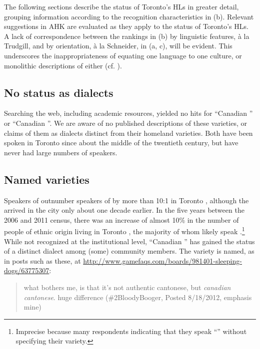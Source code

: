 \documentclass[output=paper]{LSP/langsci}
\begin{document}
The following sections describe the status of Toronto’s HLs in greater detail, grouping information according to the recognition characteristics in  (b). Relevant suggestions in AHK are evaluated as they apply to the status of Toronto’s HLs. A lack of correspondence between the rankings in  (b) by linguistic features, à la Trudgill, and by orientation, à la Schneider, in  (a, c), will be evident. This underscores the inappropriateness of equating one language to one culture, or monolithic descriptions of either (cf. \citealt{foley_personhood_2005}). 

\subsection{No status as dialects}

Searching the web, including academic resources, yielded no hits for “Canadian ” or “Canadian ”. We are aware of no published descriptions of these varieties, or claims of them as dialects distinct from their homeland varieties. Both have been spoken in Toronto since about the middle of the twentieth century, but have never had large numbers of speakers.

\subsection{Named varieties}

Speakers of  outnumber speakers of  by more than 10:1 in Toronto \citep{statistics_canada_census_2011}, although the  arrived in the city only about one decade earlier. In the five years between the 2006 and 2011 census, there was an increase of almost 10\% in the number of people of  ethnic origin living in Toronto \citep{statistics_canada_2011_2011}, the majority of whom likely speak .\footnote{ Imprecise because many respondents indicating that they speak “” without specifying their variety. } While not recognized at the institutional level, “Canadian ” has gained the status of a distinct dialect among (some) community members. The variety is named, as in posts such as these, at \url{http://www.gamefaqs.com/boards/981401-sleeping-dogs/63775307}:

\begin{quote}
what bothers me, is that it’s not authentic cantonese, but \textit{canadian cantonese}. huge difference (\#2BloodyBooger, Posted 8/18/2012, emphasis mine)
\end{quote}
\end{document}
